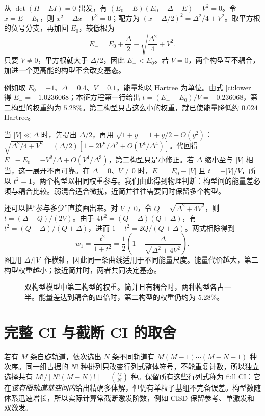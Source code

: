 从 $\det(H-EI)=0$ 出发，有 $(E_0-E)(E_0+\Delta-E)-V^2=0$。令 $x=E-E_0$，则 $x^2-\Delta x-V^2=0$；配方为 $(x-\Delta/2)^2=\Delta^2/4+V^2$。取平方根的负号分支，再加回 $E_0$，较低根为
\begin{equation}\label{ci:lower}
E_-=E_0+\frac{\Delta}{2}-\sqrt{\frac{\Delta^2}{4}+V^2}.
\end{equation}
只要 $V\ne0$，平方根就大于 $\Delta/2$，因此 $E_-<E_0$。若 $V=0$，两个构型互不耦合，加进一个更高能的构型不会改变基态。

例如取 $E_0=-1$、$\Delta=0.4$、$V=0.1$，能量均以 Hartree 为单位。由式 \eqref{ci:lower} 得 $E_-=-1.0236068$；本征方程第一行给出 $t=(E_--E_0)/V=-0.236068$，第二构型的权重约为 $5.28\%$。第二构型只占这么小的权重，就已使能量降低约 $0.024$ Hartree。

当 $|V|\ll\Delta$ 时，先提出 $\Delta/2$，再用 $\sqrt{1+y}=1+y/2+O(y^2)$：$\sqrt{\Delta^2/4+V^2}=(\Delta/2)[1+2V^2/\Delta^2+O(V^4/\Delta^4)]$。代回得 $E_--E_0=-V^2/\Delta+O(V^4/\Delta^3)$，第二构型只是小修正。若 $\Delta$ 缩小至与 $|V|$ 相当，这一展开不再可靠。在 $\Delta=0$、$V\ne0$ 时，$E_-=E_0-|V|$ 且 $t=-|V|/V$，所以 $t^2=1$，两个构型以相同权重参与。我们由此得到物理判断：构型间的能量差必须与耦合比较。弱混合适合微扰，近简并往往需要同时保留多个构型。

还可以把“参与多少”直接画出来。对 $V\ne0$，令 $Q=\sqrt{\Delta^2+4V^2}$，则 $t=(\Delta-Q)/(2V)$。由于 $4V^2=(Q-\Delta)(Q+\Delta)$，有 $t^2=(Q-\Delta)/(Q+\Delta)$，进而 $1+t^2=2Q/(Q+\Delta)$。两式相除得到
\begin{equation}\label{ci:weight}
w_1=\frac{t^2}{1+t^2}
=\frac12\left(1-\frac{\Delta}{\sqrt{\Delta^2+4V^2}}\right).
\end{equation}
图\ref{ci:mixing-figure}用 $\Delta/|V|$ 作横轴，因此同一条曲线适用于不同能量尺度。能量代价越大，第二构型权重越小；接近简并时，两者共同决定基态。

\begin{figure}[htbp]
\centering

\caption{双构型模型中第二构型的权重。简并且有耦合时，两种构型各占一半。能量差达到耦合的四倍时，第二构型的权重仍约为 $5.28\%$。}
\label{ci:mixing-figure}
\end{figure}

\section{完整 CI 与截断 CI 的取舍}
若有 $M$ 条自旋轨道，依次选出 $N$ 条不同轨道有 $M(M-1)\cdots(M-N+1)$ 种次序。同一组占据的 $N!$ 种排列只改变行列式整体符号，不能重复计数，所以独立选择共有 $M!/[N!(M-N)!]=\binom MN$ 种。保留所有这些行列式称为 full CI：它在\emph{该有限轨道基空间内}给出精确多体解，但仍有单粒子基组不完备误差。构型数随体系迅速增长，所以实际计算常截断激发阶数，例如 CISD 保留参考、单激发和双激发。

